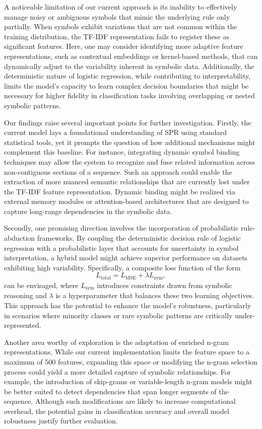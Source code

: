 \documentclass{article}
\begin{document}
A noticeable limitation of our current approach is its inability to effectively manage noisy or ambiguous symbols that mimic the underlying rule only partially. When symbols exhibit variations that are not common within the training distribution, the TF-IDF representation fails to register these as significant features. Here, one may consider identifying more adaptive feature representations, such as contextual embeddings or kernel-based methods, that can dynamically adjust to the variability inherent in symbolic data. Additionally, the deterministic nature of logistic regression, while contributing to interpretability, limits the model's capacity to learn complex decision boundaries that might be necessary for higher fidelity in classification tasks involving overlapping or nested symbolic patterns.

Our findings raise several important points for further investigation. Firstly, the current model lays a foundational understanding of SPR using standard statistical tools, yet it prompts the question of how additional mechanisms might complement this baseline. For instance, integrating dynamic symbol binding techniques may allow the system to recognize and fuse related information across non-contiguous sections of a sequence. Such an approach could enable the extraction of more nuanced semantic relationships that are currently lost under the TF-IDF feature representation. Dynamic binding might be realized via external memory modules or attention-based architectures that are designed to capture long-range dependencies in the symbolic data.

Secondly, one promising direction involves the incorporation of probabilistic rule-abduction frameworks. By coupling the deterministic decision rule of logistic regression with a probabilistic layer that accounts for uncertainty in symbol interpretation, a hybrid model might achieve superior performance on datasets exhibiting high variability. Specifically, a composite loss function of the form
\[
L_{\text{total}} = L_{\text{MSE}} + \lambda L_{\text{sym}},
\]
can be envisaged, where \(L_{\text{sym}}\) introduces constraints drawn from symbolic reasoning and \(\lambda\) is a hyperparameter that balances these two learning objectives. This approach has the potential to enhance the model’s robustness, particularly in scenarios where minority classes or rare symbolic patterns are critically under-represented.

Another area worthy of exploration is the adaptation of enriched n-gram representations. While our current implementation limits the feature space to a maximum of 500 features, expanding this space or modifying the n-gram selection process could yield a more detailed capture of symbolic relationships. For example, the introduction of skip-grams or variable-length n-gram models might be better suited to detect dependencies that span longer segments of the sequence. Although such modifications are likely to increase computational overhead, the potential gains in classification accuracy and overall model robustness justify further evaluation.
\end{document}
